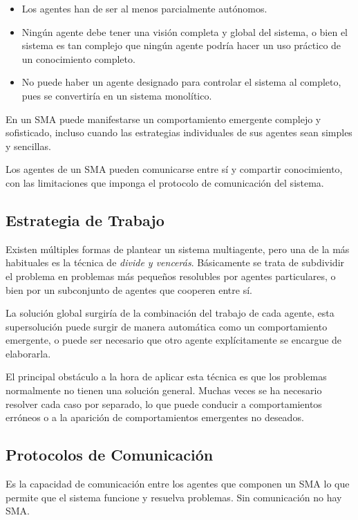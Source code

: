 \begin{itemize}
 \item Los agentes han de ser al menos parcialmente autónomos.
 \item Ningún agente debe tener una visión completa y global del sistema, o
 bien el sistema es tan complejo que ningún agente podría hacer un uso práctico
 de un conocimiento completo.
 \item No puede haber un agente designado para controlar el sistema al
 completo, pues se convertiría en un sistema monolítico.
\end{itemize}

En un SMA puede manifestarse un comportamiento emergente complejo y sofisticado,
incluso cuando las estrategias individuales de sus agentes sean simples y
sencillas.

Los agentes de un SMA pueden comunicarse entre sí y compartir conocimiento, con
las limitaciones que imponga el protocolo de comunicación del sistema.

\subsection*{Estrategia de Trabajo}

Existen múltiples formas de plantear un sistema multiagente, pero una de la más
habituales es la técnica de {\em divide y vencerás}. Básicamente se trata de
subdividir el problema en problemas más pequeños resolubles por agentes
particulares, o bien por un subconjunto de agentes que cooperen entre sí.

La solución global surgiría de la combinación del trabajo de cada agente, esta
supersolución puede surgir de manera automática como un comportamiento
emergente, o puede ser necesario que otro agente explícitamente se encargue de
elaborarla.

El principal obstáculo a la hora de aplicar esta técnica es que los problemas
normalmente no tienen una solución general. Muchas veces se ha necesario
resolver cada caso por separado, lo que puede conducir a comportamientos
erróneos o a la aparición de comportamientos emergentes no deseados.

\subsection*{Protocolos de Comunicación}

Es la capacidad de comunicación entre los agentes que componen un SMA lo que
permite que el sistema funcione y resuelva problemas. Sin comunicación no hay
SMA.

